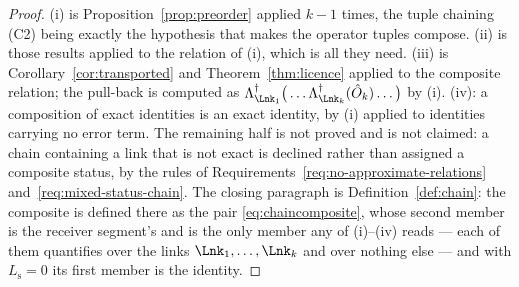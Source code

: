 \begin{proof}
(i) is Proposition~\ref{prop:preorder} applied $k-1$ times, the tuple chaining
(C2) being exactly the hypothesis that makes the operator tuples compose. (ii)
is those results applied to the relation of (i), which is all they need. (iii)
is Corollary~\ref{cor:transported} and Theorem~\ref{thm:licence} applied to the
composite relation; the pull-back is computed as
$\Lambda_{\Lnk_1}^{\dagger}\big(\dots\Lambda_{\Lnk_k}^{\dagger}
(\hat O_k)\dots\big)$ by (i). (iv): a composition of exact identities is an
exact identity, by (i) applied to identities carrying no error term. The
remaining half is not proved and is not claimed: a chain containing a link
that is not \textsf{exact} is declined rather than assigned a composite
status, by the rules of Requirements~\ref{req:no-approximate-relations}
and~\ref{req:mixed-status-chain}.
The closing paragraph is Definition~\ref{def:chain}: the composite is defined
there as the pair \eqref{eq:chaincomposite}, whose second member is the
receiver segment's and is the only member any of (i)--(iv) reads --- each of
them quantifies over the links $\Lnk_1,\dots,\Lnk_k$ and over nothing else ---
and with $L_{\mathrm s}=0$ its first member is the identity.
\end{proof}
